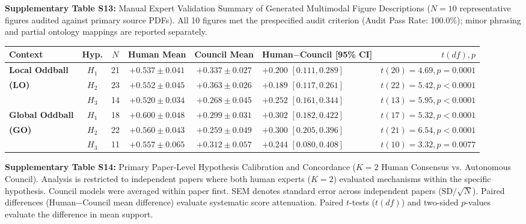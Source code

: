 \documentclass[12pt]{article}
\begin{document}
\noindent\textbf{Supplementary Table S13:} Manual Expert Validation Summary of Generated Multimodal Figure Descriptions ($N=10$ representative figures audited against primary source PDFs). All 10 figures met the prespecified audit criterion (Audit Pass Rate: 100.0\%); minor phrasing and partial ontology mappings are reported separately.

\vspace{1.5em}

\begingroup
\footnotesize
\setlength{\tabcolsep}{2.5pt}
\noindent\begin{tabularx}{\textwidth}{@{}l c c c c >{\centering\arraybackslash}X r@{}}
\toprule
\textbf{Context} & \textbf{Hyp.} & \textbf{$N$} & \textbf{Human Mean} & \textbf{Council Mean} & \textbf{Human$-$Council [95\% CI]} & \textbf{$t(df), p$} \\
\midrule
\textbf{Local Oddball}  & $H_1$ & 21 & $+0.537 \pm 0.041$ & $+0.337 \pm 0.027$ & $+0.200$ $[0.111, 0.289]$ & $t(20)=4.69, p=0.0001$ \\
\textbf{(LO)}           & $H_2$ & 23 & $+0.552 \pm 0.045$ & $+0.363 \pm 0.026$ & $+0.189$ $[0.117, 0.261]$ & $t(22)=5.42, p<0.0001$ \\
                        & $H_3$ & 14 & $+0.520 \pm 0.034$ & $+0.268 \pm 0.045$ & $+0.252$ $[0.161, 0.344]$ & $t(13)=5.95, p<0.0001$ \\
\midrule
\textbf{Global Oddball} & $H_1$ & 18 & $+0.600 \pm 0.048$ & $+0.299 \pm 0.031$ & $+0.302$ $[0.182, 0.422]$ & $t(17)=5.32, p<0.0001$ \\
\textbf{(GO)}           & $H_2$ & 22 & $+0.560 \pm 0.043$ & $+0.259 \pm 0.049$ & $+0.300$ $[0.205, 0.396]$ & $t(21)=6.54, p<0.0001$ \\
                        & $H_3$ & 11 & $+0.557 \pm 0.065$ & $+0.312 \pm 0.057$ & $+0.244$ $[0.080, 0.408]$ & $t(10)=3.32, p=0.0077$ \\
\bottomrule
\end{tabularx}
\endgroup
\vspace{0.4em}

\noindent\textbf{Supplementary Table S14:} Primary Paper-Level Hypothesis Calibration and Concordance ($K=2$ Human Consensus vs. Autonomous Council). Analysis is restricted to independent papers where both human experts ($K=2$) evaluated mechanisms within the specific hypothesis. Council models were averaged within paper first. SEM denotes standard error across independent papers ($\text{SD}/\sqrt{N}$). Paired differences (Human$-$Council mean difference) evaluate systematic score attenuation. Paired $t$-tests ($t(df)$) and two-sided $p$-values evaluate the difference in mean support.
\end{document}
